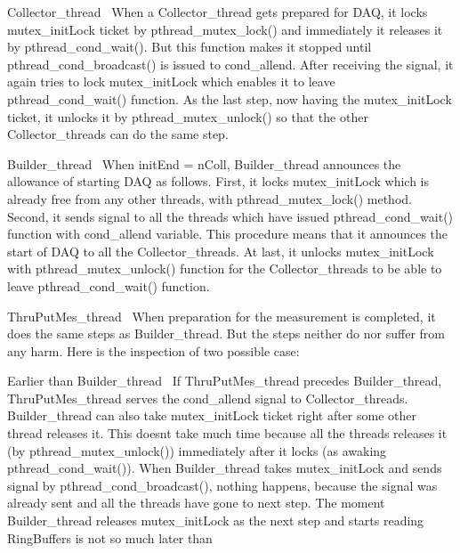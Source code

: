 \begin{DoxyItemize}
\item Collector\+\_\+thread~\newline
 When a Collector\+\_\+thread gets prepared for D\+A\+Q, it locks {\ttfamily mutex\+\_\+init\+Lock} ticket by {\ttfamily pthread\+\_\+mutex\+\_\+lock()} and immediately it releases it by {\ttfamily pthread\+\_\+cond\+\_\+wait()}. But this function makes it stopped until {\ttfamily pthread\+\_\+cond\+\_\+broadcast()} is issued to {\ttfamily cond\+\_\+allend}. After receiving the signal, it again tries to lock {\ttfamily mutex\+\_\+init\+Lock} which enables it to leave {\ttfamily pthread\+\_\+cond\+\_\+wait()} function. As the last step, now having the {\ttfamily mutex\+\_\+init\+Lock} ticket, it unlocks it by {\ttfamily pthread\+\_\+mutex\+\_\+unlock()} so that the other Collector\+\_\+threads can do the same step.
\item Builder\+\_\+thread~\newline
 When {\ttfamily init\+End} = {\ttfamily n\+Coll}, Builder\+\_\+thread announces the allowance of starting D\+A\+Q as follows. First, it locks {\ttfamily mutex\+\_\+init\+Lock} which is already free from any other threads, with pthread\+\_\+mutex\+\_\+lock() method. Second, it sends signal to all the threads which have issued {\ttfamily pthread\+\_\+cond\+\_\+wait()} function with {\ttfamily cond\+\_\+allend} variable. This procedure means that it announces the start of D\+A\+Q to all the Collector\+\_\+threads. At last, it unlocks {\ttfamily mutex\+\_\+init\+Lock} with {\ttfamily pthread\+\_\+mutex\+\_\+unlock()} function for the Collector\+\_\+threads to be able to leave {\ttfamily pthread\+\_\+cond\+\_\+wait()} function.
\item Thru\+Put\+Mes\+\_\+thread~\newline
 When preparation for the measurement is completed, it does the same steps as Builder\+\_\+thread. But the steps neither do nor suffer from any harm. Here is the inspection of two possible case\+:
\begin{DoxyItemize}
\item Earlier than Builder\+\_\+thread~\newline
 If Thru\+Put\+Mes\+\_\+thread precedes Builder\+\_\+thread, Thru\+Put\+Mes\+\_\+thread serves the {\ttfamily cond\+\_\+allend} signal to Collector\+\_\+threads. Builder\+\_\+thread can also take {\ttfamily mutex\+\_\+init\+Lock} ticket right after some other thread releases it. This doesn\textquotesingle{}t take much time because all the threads releases it (by {\ttfamily pthread\+\_\+mutex\+\_\+unlock()}) immediately after it locks (as awaking {\ttfamily pthread\+\_\+cond\+\_\+wait()}). When Builder\+\_\+thread takes {\ttfamily mutex\+\_\+init\+Lock} and sends signal by {\ttfamily pthread\+\_\+cond\+\_\+broadcast()}, nothing happens, because the signal was already sent and all the threads have gone to next step. The moment Builder\+\_\+thread releases {\ttfamily mutex\+\_\+init\+Lock} as the next step and starts reading Ring\+Buffers is not so much later than

\end{DoxyItemize}
\end{DoxyItemize}
